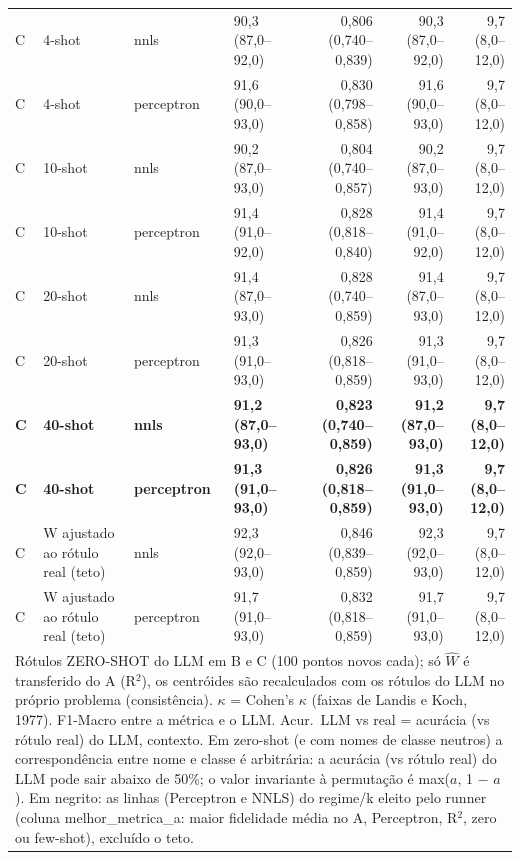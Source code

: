 \begin{table}[htbp]
\begin{tabular}{llllrrr}
C & 4-shot & nnls & 90,3 (87,0–92,0) & 0,806 (0,740–0,839) & 90,3 (87,0–92,0) & 9,7 (8,0–12,0) \\
C & 4-shot & perceptron & 91,6 (90,0–93,0) & 0,830 (0,798–0,858) & 91,6 (90,0–93,0) & 9,7 (8,0–12,0) \\
C & 10-shot & nnls & 90,2 (87,0–93,0) & 0,804 (0,740–0,857) & 90,2 (87,0–93,0) & 9,7 (8,0–12,0) \\
C & 10-shot & perceptron & 91,4 (91,0–92,0) & 0,828 (0,818–0,840) & 91,4 (91,0–92,0) & 9,7 (8,0–12,0) \\
C & 20-shot & nnls & 91,4 (87,0–93,0) & 0,828 (0,740–0,859) & 91,4 (87,0–93,0) & 9,7 (8,0–12,0) \\
C & 20-shot & perceptron & 91,3 (91,0–93,0) & 0,826 (0,818–0,859) & 91,3 (91,0–93,0) & 9,7 (8,0–12,0) \\
\textbf{C} & \textbf{40-shot} & \textbf{nnls} & \textbf{91,2 (87,0–93,0)} & \textbf{0,823 (0,740–0,859)} & \textbf{91,2 (87,0–93,0)} & \textbf{9,7 (8,0–12,0)} \\
\textbf{C} & \textbf{40-shot} & \textbf{perceptron} & \textbf{91,3 (91,0–93,0)} & \textbf{0,826 (0,818–0,859)} & \textbf{91,3 (91,0–93,0)} & \textbf{9,7 (8,0–12,0)} \\
C & W ajustado ao rótulo real (teto) & nnls & 92,3 (92,0–93,0) & 0,846 (0,839–0,859) & 92,3 (92,0–93,0) & 9,7 (8,0–12,0) \\
C & W ajustado ao rótulo real (teto) & perceptron & 91,7 (91,0–93,0) & 0,832 (0,818–0,859) & 91,7 (91,0–93,0) & 9,7 (8,0–12,0) \\
\bottomrule
\multicolumn{7}{p{0.95\linewidth}}{\footnotesize Rótulos ZERO-SHOT do LLM em B e C (100 pontos novos cada); só $\hat{W}$ é transferido do A (R$^2$), os centróides são recalculados com os rótulos do LLM no próprio problema (consistência). $\kappa$ = Cohen's $\kappa$ (faixas de Landis e Koch, 1977). F1-Macro entre a métrica e o LLM. Acur.\ LLM vs real = acurácia (vs rótulo real) do LLM, contexto. Em zero-shot (e com nomes de classe neutros) a correspondência entre nome e classe é arbitrária: a acurácia (vs rótulo real) do LLM pode sair abaixo de 50\%; o valor invariante à permutação é max($a$, 1 $-$ $a$). Em negrito: as linhas (Perceptron e NNLS) do regime/k eleito pelo runner (coluna melhor\_metrica\_a: maior fidelidade média no A, Perceptron, R$^2$, zero ou few-shot), excluído o teto.} \\
\end{tabular}
\end{table}
